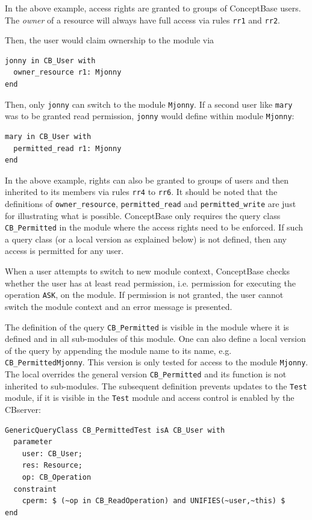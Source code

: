 In the above example, access rights are granted to groups of ConceptBase users. 
The {\em owner} of a resource will always have full access via rules {\tt rr1} and {\tt rr2}.

Then, the user would claim ownership to the module via

\begin{verbatim}
jonny in CB_User with
  owner_resource r1: Mjonny
end
\end{verbatim}

Then, only {\tt jonny} can switch to the module {\tt Mjonny}. If a second user like {\tt mary}
was to be granted read permission, {\tt jonny} would define within module {\tt Mjonny}:

\begin{verbatim}
mary in CB_User with
  permitted_read r1: Mjonny
end
\end{verbatim}

In the above example, rights can also be granted to groups of users and then inherited to
its members via rules {\tt rr4} to {\tt rr6}.
It should be noted that the definitions of {\tt owner\_resource}, {\tt permitted\_read} and
{\tt permitted\_write} are just for illustrating what is possible. ConceptBase only
requires the query class {\tt CB\_Permitted} in the module where the access rights need
to be enforced. If such a query class (or a local version as explained below) is not
defined, then any access is permitted for any user.

When a user attempts to switch to new module context, ConceptBase checks whether
the user has at least read permission, i.e. permission for executing the
operation {\tt ASK}, on the module. If permission is not granted, the user 
cannot switch the module context and an error message is presented.


The definition of the query {\tt CB\_Permitted} is visible in the module where it is
defined and in all sub-modules of this module. One can also define a local version
of the query by appending the module name to its name, e.g. {\tt CB\_PermittedMjonny}.
This version is only tested for access to the module {\tt Mjonny}. The local
overrides the general version {\tt CB\_Permitted} and its function is not inherited to sub-modules. 
The subsequent definition prevents updates to the {\tt Test} module, if it is
visible in the {\tt Test} module and access control is enabled by the CBserver:

\begin{verbatim}
GenericQueryClass CB_PermittedTest isA CB_User with
  parameter
    user: CB_User;
    res: Resource;
    op: CB_Operation
  constraint
    cperm: $ (~op in CB_ReadOperation) and UNIFIES(~user,~this) $
end
\end{verbatim}


